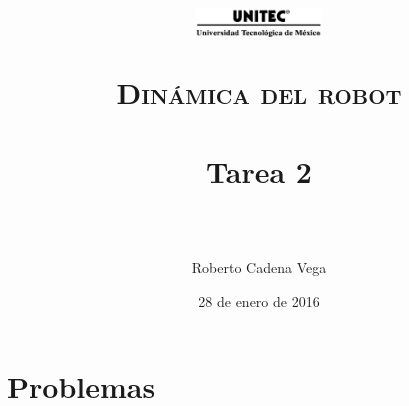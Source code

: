 



\title{
	\normalfont \normalsize
	\begin{figure}[h]
		\begin{center}
			\includegraphics[width=0.3\textwidth]{../images/UNITEC.png}
		\end{center}
	\end{figure}
	\textsc{Dinámica del robot} \\ [25pt]
	\horrule{0.5pt} \\[0.4cm] %
	\huge Tarea 2 \\ %
	\horrule{2pt} \\[0.5cm] %
}

\author{Roberto Cadena Vega} %

\date{\normalsize 28 de enero de 2016} %




\maketitle %


\section{Problemas}

